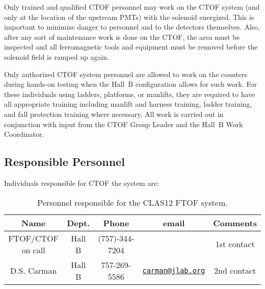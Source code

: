 Only trained and qualified CTOF personnel may work on the CTOF system (and only at the 
location of the upstream PMTs) with the solenoid energized. This is important to minimize 
danger to personnel and to the detectors themselves. Also, after any sort of maintenance 
work is done on the CTOF, the area must be inspected and all ferromagnetic tools and 
equipment must be removed before the solenoid field is ramped up again.

Only authorized CTOF system personnel are allowed to work on the counters during hands-on
testing when the Hall~B configuration allows for such work. For these individuals using 
ladders, platforms, or manlifts, they are required to have all appropriate training 
including manlift and harness training, ladder training, and fall protection training where
necessary. All work is carried out in conjunction with input from the CTOF Group Leader and
the Hall~B Work Coordinator.

\subsection{Responsible Personnel}

Individuals responsible for CTOF the system are:

\begin{table}[!htb]
\centering
\begin{tabular}{|c|c|c|c|c|} \hline
Name              & Dept.  & Phone          & email & Comments \\ \hline
FTOF/CTOF on call & Hall B & (757)-344-7204 &       & 1st contact \\ \hline
D.S. Carman       & Hall B & 757-269-5586          & \href{mailto:carman@jlab.org}{\nolinkurl{carman@jlab.org}} & 2nd contact \\ \hline
\end{tabular}
\caption{Personnel responsible for the CLAS12 FTOF system.} 
\label{tb:ftof}
\end{table}

\vfil
\eject
